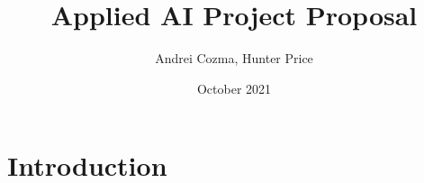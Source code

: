 \documentclass{article}
\title{Applied AI Project Proposal}
\author{Andrei Cozma, Hunter Price}
\date{October 2021}
\begin{document}
\maketitle

\section{Introduction}
\end{document}

